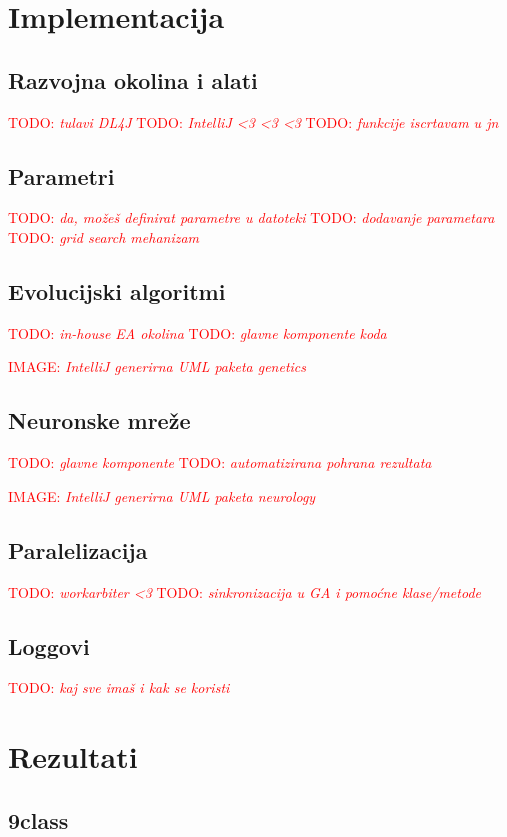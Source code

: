 \documentclass[times, utf8, diplomski]{fer}
\def\TODO#1{\noindent\textcolor{red}{TODO: \textit{#1}}\newline}
\def\todo#1{\TODO{#1}}
\def\todoimg#1{\begin{center} \textcolor{red}{IMAGE: \textit{#1}} \end{center}}
\begin{document}
\chapter{Implementacija}
\section{Razvojna okolina i alati}
\todo{tulavi DL4J}
\todo{IntelliJ <3 <3 <3}
\todo{funkcije iscrtavam u jn}

\section{Parametri}
\todo{da, možeš definirat parametre u datoteki}
\todo{dodavanje parametara}
\todo{grid search mehanizam}

\section{Evolucijski algoritmi}
\todo{in-house EA okolina}
\todo{glavne komponente koda}
\todoimg{IntelliJ generirna UML paketa genetics}

\section{Neuronske mreže}
\todo{glavne komponente}
\todo{automatizirana pohrana rezultata}
\todoimg{IntelliJ generirna UML paketa neurology}

\section{Paralelizacija}
\todo{workarbiter <3}
\todo{sinkronizacija u GA i pomoćne klase/metode}

\section{Loggovi}
\todo{kaj sve imaš i kak se koristi}

\chapter{Rezultati}

\section{9class}
\end{document}

